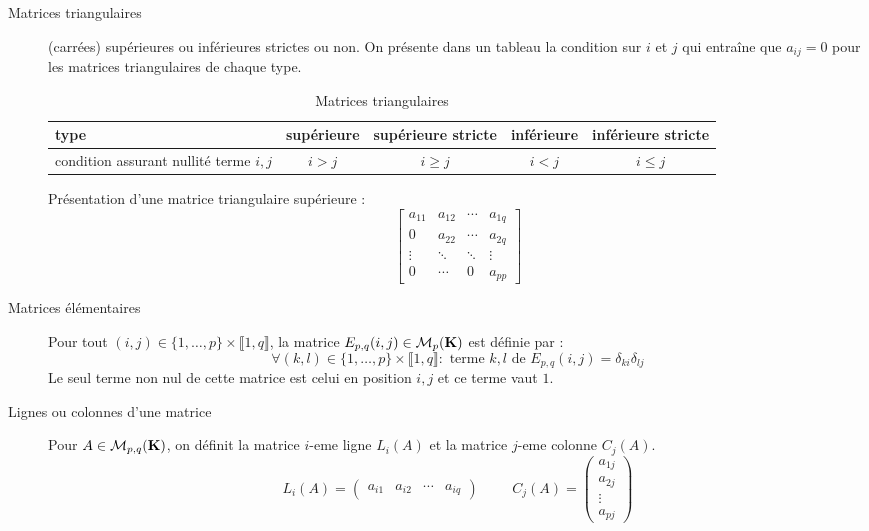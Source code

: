 \begin{description}
  \item [Matrices triangulaires] (carrées)  supérieures ou inférieures strictes ou non. On présente dans un tableau la condition sur $i$ et $j$ qui entraîne que $a_{i j}=0$ pour les matrices triangulaires de chaque type.
  
\begin{table}[h!]  
\begin{center}
\medskip
\renewcommand{\arraystretch}{1.4}
\begin{tabular}{|l|c|c|c|c|} \hline 
type & supérieure & supérieure stricte & inférieure & inférieure stricte\\ \hline
condition assurant nullité terme $i,j$ & $i > j$ & $i \geq j$ & $i < j$ & $i \leq j$ \\ \hline
\end{tabular}
\end{center}
\caption{Matrices triangulaires}\label{tab:triang}
\end{table}
\medskip
Présentation d'une matrice triangulaire supérieure :
\begin{displaymath}
 \begin{bmatrix}
  a_{11}& a_{12} & \cdots & a_{1q} \\
  0 & a_{22} & \cdots & a_{2q} \\
  \vdots  &\ddots  & \ddots &\vdots  \\
  0 & \cdots & 0 & a_{pp}
 \end{bmatrix}
\end{displaymath}

  \item[Matrices élémentaires]  Pour tout $(i,j)\in \{1,\dots,p\}\times\llbracket 1,q \rrbracket$, la matrice $E_{p,q}(i,j) \in \mathcal M_{p}(\mathbf{K})$  est  définie par :
\begin{displaymath}
 \forall (k,l)\in \{1,\dots,p\}\times\llbracket 1,q \rrbracket : 
\text{ terme } k,l \text{ de } E_{p,q}(i,j) = \delta_{ki}\delta_{lj}
\end{displaymath}
Le seul terme non nul de cette matrice est celui en position $i,j$ et ce terme vaut $1$.

 \item[Lignes ou colonnes d'une matrice] Pour $A\in \mathcal{M}_{p,q}(\mathbf{K})$, on définit la matrice $i$-eme ligne $L_i(A)$ et la matrice $j$-eme colonne $C_j(A)$.
\begin{displaymath}
  L_i(A) = \begin{pmatrix} a_{i1} & a_{i2} & \cdots & a_{iq}\end{pmatrix} \hspace{1cm}
  C_j(A) = \begin{pmatrix} a_{1j} \\ a_{2j} \\ \vdots \\ a_{pj} \end{pmatrix}
\end{displaymath}


\end{description}

